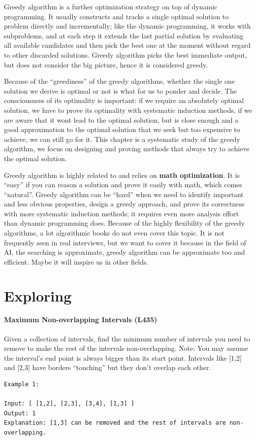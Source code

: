 \documentclass[../main.tex]{subfiles}
\begin{document}
Greedy algorithm is a further optimization strategy on top of dynamic programming. It usually  constructs and tracks a single optimal solution to problem directly and incrementally; like the dynamic programming, it works with subproblems, and at each step it extends the last partial solution by evaluating all available candidates and then pick the best one at the moment without regard to other discarded solutions.  Greedy algorithm picks the best immediate output, but does not consider the big picture, hence it is considered greedy.

Because of the ``greediness'' of the greedy algorithms, whether the single one solution we derive is optimal or not is what for us to ponder and decide. The consciousness of its optimality is important: if we require an absolutely optimal solution, we have to prove its optimality with systematic induction methods, if we are aware that it wont lead to the optimal solution, but is close enough and a good approximation to the optimal solution that we seek but too expensive to achieve, we can still go for it. This chapter is a systematic study of the greedy algorithm, we focus on designing and proving methods that always try to achieve the optimal solution. 

Greedy algorithm is highly related to and relies on \textbf{math optimization}. It is ``easy'' if you can reason a solution and prove it easily with math, which comes ``natural''.  Greedy algorithm can be ``hard'' when we need to identify important and less obvious properties,  design a greedy approach, and prove its correctness with more systematic induction methods; it requires even more analysis effort than dynamic programming does. Because of the highly flexibility of the greedy algorithms, a lot algorithmic books do not even cover this topic. 
It is not frequently seen in real interviews, but we want to cover it because in the field of AI, the searching is approximate, greedy algorithm can be approximate too and efficient. Maybe it will inspire us in other fields. 


\section{Exploring}
\paragraph{Maximum Non-overlapping Intervals (L435)} Given a collection of intervals, find the minimum number of intervals you need to remove to make the rest of the intervals non-overlapping. Note: You may assume the interval’s end point is always bigger than its start point. Intervals like [1,2] and [2,3] have borders “touching” but they don’t overlap each other.
\begin{lstlisting}[numbers=none]
Example 1:

Input: [ [1,2], [2,3], [3,4], [1,3] ]
Output: 1
Explanation: [1,3] can be removed and the rest of intervals are non-overlapping.
\end{lstlisting}
\end{document}

